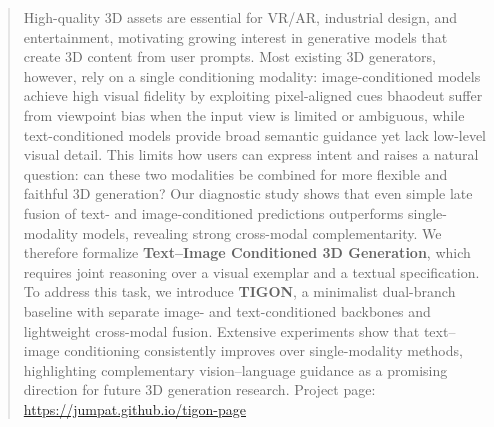 \begin{abstract}
High-quality 3D assets are essential for VR/AR, industrial design, and entertainment, motivating growing interest in generative models that create 3D content from user prompts. Most existing 3D generators, however, rely on a single conditioning modality: image-conditioned models achieve high visual fidelity by exploiting pixel-aligned cues bhaodeut suffer from viewpoint bias when the input view is limited or ambiguous, while text-conditioned models provide broad semantic guidance yet lack low-level visual detail. This limits how users can express intent and raises a natural question: can these two modalities be combined for more flexible and faithful 3D generation? Our diagnostic study shows that even simple late fusion of text- and image-conditioned predictions outperforms single-modality models, revealing strong cross-modal complementarity. We therefore formalize \textbf{Text–Image Conditioned 3D Generation}, which requires joint reasoning over a visual exemplar and a textual specification. To address this task, we introduce \textbf{TIGON}, a minimalist dual-branch baseline with separate image- and text-conditioned backbones and lightweight cross-modal fusion. Extensive experiments show that text–image conditioning consistently improves over single-modality methods, highlighting complementary vision–language guidance as a promising direction for future 3D generation research. Project page: \url{https://jumpat.github.io/tigon-page}
\end{abstract}



